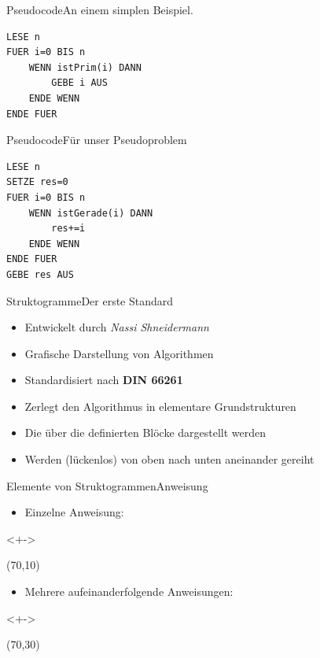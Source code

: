 \begin{frame}[fragile]{Pseudocode}{An einem simplen Beispiel.}
\lstset{style=pseudo}
\begin{lstlisting}
LESE n
FUER i=0 BIS n
    WENN istPrim(i) DANN
        GEBE i AUS
    ENDE WENN
ENDE FUER
\end{lstlisting}
\end{frame}

\begin{frame}[fragile]{Pseudocode}{Für unser Pseudoproblem}
\lstset{style=pseudo}
\begin{onlyenv}
\begin{lstlisting}
LESE n
SETZE res=0
FUER i=0 BIS n
    WENN istGerade(i) DANN
        res+=i
    ENDE WENN
ENDE FUER
GEBE res AUS
\end{lstlisting}
\end{onlyenv}
\end{frame}

\begin{frame}{Struktogramme}{Der erste Standard}
    \begin{itemize}
        \item Entwickelt durch \textit{Nassi Shneidermann}
        \item Grafische Darstellung von Algorithmen
        \item Standardisiert nach \textbf{DIN 66261}
        \item Zerlegt den Algorithmus in elementare Grundstrukturen
        \item Die über die definierten Blöcke dargestellt werden
        \item Werden (lückenlos) von oben nach unten aneinander gereiht
    \end{itemize}
\end{frame}

\begin{frame}{Elemente von Struktogrammen}{Anweisung}
\begin{itemize}
    \item <+->Einzelne Anweisung:
\end{itemize}
\begin{onlyenv}<+->
\begin{centernss}
    \begin{struktogramm}(70,10)
    \end{struktogramm}
\end{centernss}
\end{onlyenv}

\begin{itemize}
    \item <+-> Mehrere aufeinanderfolgende Anweisungen:
\end{itemize}
\begin{onlyenv}<+->
\begin{centernss}
    \begin{struktogramm}(70,30)
    \end{struktogramm}
\end{centernss}
\end{onlyenv}
\end{frame}

